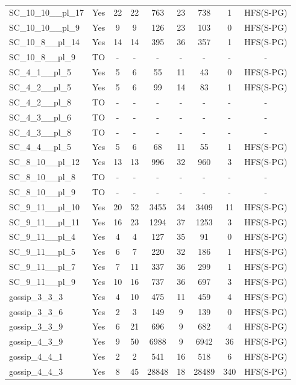 \documentclass{article}
\begin{document}
\begin{tabular}{lcccccccc}
SC\_10\_10\_\_pl\_17 & Yes & 22 & 22 & 763 & 23 & 738 & 1 & HFS(S-PG) \\
SC\_10\_10\_\_pl\_9 & Yes & 9 & 9 & 126 & 23 & 103 & 0 & HFS(S-PG) \\
SC\_10\_8\_\_pl\_14 & Yes & 14 & 14 & 395 & 36 & 357 & 1 & HFS(S-PG) \\
SC\_10\_8\_\_pl\_9 & TO & - & - & - & - & - & - & - \\
SC\_4\_1\_\_pl\_5 & Yes & 5 & 6 & 55 & 11 & 43 & 0 & HFS(S-PG) \\
SC\_4\_2\_\_pl\_5 & Yes & 5 & 6 & 99 & 14 & 83 & 1 & HFS(S-PG) \\
SC\_4\_2\_\_pl\_8 & TO & - & - & - & - & - & - & - \\
SC\_4\_3\_\_pl\_6 & TO & - & - & - & - & - & - & - \\
SC\_4\_3\_\_pl\_8 & TO & - & - & - & - & - & - & - \\
SC\_4\_4\_\_pl\_5 & Yes & 5 & 6 & 68 & 11 & 55 & 1 & HFS(S-PG) \\
SC\_8\_10\_\_pl\_12 & Yes & 13 & 13 & 996 & 32 & 960 & 3 & HFS(S-PG) \\
SC\_8\_10\_\_pl\_8 & TO & - & - & - & - & - & - & - \\
SC\_8\_10\_\_pl\_9 & TO & - & - & - & - & - & - & - \\
SC\_9\_11\_\_pl\_10 & Yes & 20 & 52 & 3455 & 34 & 3409 & 11 & HFS(S-PG) \\
SC\_9\_11\_\_pl\_11 & Yes & 16 & 23 & 1294 & 37 & 1253 & 3 & HFS(S-PG) \\
SC\_9\_11\_\_pl\_4 & Yes & 4 & 4 & 127 & 35 & 91 & 0 & HFS(S-PG) \\
SC\_9\_11\_\_pl\_5 & Yes & 6 & 7 & 220 & 32 & 186 & 1 & HFS(S-PG) \\
SC\_9\_11\_\_pl\_7 & Yes & 7 & 11 & 337 & 36 & 299 & 1 & HFS(S-PG) \\
SC\_9\_11\_\_pl\_9 & Yes & 10 & 16 & 737 & 36 & 697 & 3 & HFS(S-PG) \\
gossip\_3\_3\_3 & Yes & 4 & 10 & 475 & 11 & 459 & 4 & HFS(S-PG) \\
gossip\_3\_3\_6 & Yes & 2 & 3 & 149 & 9 & 139 & 0 & HFS(S-PG) \\
gossip\_3\_3\_9 & Yes & 6 & 21 & 696 & 9 & 682 & 4 & HFS(S-PG) \\
gossip\_4\_3\_9 & Yes & 9 & 50 & 6988 & 9 & 6942 & 36 & HFS(S-PG) \\
gossip\_4\_4\_1 & Yes & 2 & 2 & 541 & 16 & 518 & 6 & HFS(S-PG) \\
gossip\_4\_4\_3 & Yes & 8 & 45 & 28848 & 18 & 28489 & 340 & HFS(S-PG) \\

\end{tabular}
\end{document}
